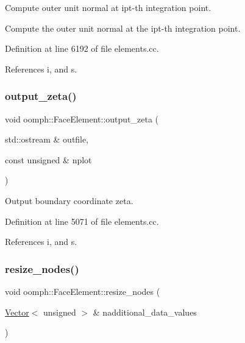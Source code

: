 Compute outer unit normal at ipt-\/th integration point. 

Compute the outer unit normal at the ipt-\/th integration point. 

Definition at line 6192 of file elements.\+cc.



References i, and s.

\mbox{\label{classoomph_1_1FaceElement_adf2632a515afa6efdc884e6def8a4163}} 
\subsubsection{\texorpdfstring{output\+\_\+zeta()}{output\_zeta()}}
{\footnotesize\ttfamily void oomph\+::\+Face\+Element\+::output\+\_\+zeta (\begin{DoxyParamCaption}\item[{std\+::ostream \&}]{outfile,  }\item[{const unsigned \&}]{nplot }\end{DoxyParamCaption})}



Output boundary coordinate zeta. 



Definition at line 5071 of file elements.\+cc.



References i, and s.

\mbox{\label{classoomph_1_1FaceElement_ae7513d0db79b9ec47f9d72f40dbb4417}} 
\subsubsection{\texorpdfstring{resize\+\_\+nodes()}{resize\_nodes()}}
{\footnotesize\ttfamily void oomph\+::\+Face\+Element\+::resize\+\_\+nodes (\begin{DoxyParamCaption}\item[{\hyperlink{classoomph_1_1Vector}{Vector}$<$ unsigned $>$ \&}]{nadditional\+\_\+data\+\_\+values }\end{DoxyParamCaption})\hspace{0.3cm}{\ttfamily [inline]}}



